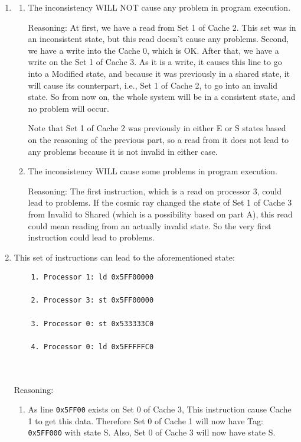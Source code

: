 \documentclass[12pt]{article}
\begin{document}
\begin{enumerate}[label=\alph*.]
\item 

\begin{enumerate}[label=B\arabic*.]
	\item The inconsistency WILL NOT cause any problem in program execution.
	
	Reasoning: At first, we have a read from Set 1 of Cache 2. This set was in an inconsistent state, but this read doesn't cause any problems. Second, we have a write into the Cache 0, which is OK. After that, we have a write on the Set 1 of Cache 3. As it is a write, it causes this line to go into a Modified state, and because it was previously in a shared state, it will cause its counterpart, i.e., Set 1 of Cache 2, to go into an invalid state. So from now on, the whole system will be in a consistent state, and no problem will occur.
	
	Note that Set 1 of Cache 2 was previously in either E or S states based on the reasoning of the previous part, so a read from it does not lead to any problems because it is not invalid in either case.
	
	\item The inconsistency WILL cause some problems in program execution.
	
	Reasoning: The first instruction, which is a read on processor 3, could lead to problems. If the cosmic ray changed the state of Set 1 of Cache 3 from Invalid to Shared (which is a possibility based on part A), this read could mean reading from an actually invalid state. So the very first instruction could lead to problems.
\end{enumerate}
\item 
This set of instructions can lead to the aforementioned state:

\begin{verbatim}
	1. Processor 1: ld 0x5FF00000
	
	2. Processor 3: st 0x5FF00000
	
	3. Processor 0: st 0x533333C0
	
	4. Processor 0: ld 0x5FFFFFC0
	
	
\end{verbatim}


Reasoning:

\begin{enumerate}[label=\arabic*.]
	\item As line \Verb+0x5FF00+ exists on Set 0 of Cache 3, This instruction cause Cache 1 to get this data. Therefore Set 0 of Cache 1 will now have Tag: \Verb+0x5FF000+ with state S. Also, Set 0 of Cache 3 will now have state S.
	

\end{enumerate}
\end{enumerate}
\end{document}
